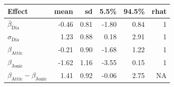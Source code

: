 
\begin{tabular}[t]{lrrrrr}
\toprule
Effect & mean & sd & 5.5\% & 94.5\% & rhat\\
\midrule
$\overline{\beta}_{\text{Dia}}$ & -0.46 & 0.81 & -1.80 & 0.84 & 1\\
$\sigma_{\text{Dia}}$ & 1.23 & 0.88 & 0.18 & 2.91 & 1\\
$\beta_{\text{Attic}}$ & -0.21 & 0.90 & -1.68 & 1.22 & 1\\
$\beta_{\text{Jonic}}$ & -1.62 & 1.16 & -3.55 & 0.15 & 1\\
$\beta_{\text{Attic}} - \beta_{\text{Jonic}}$ & 1.41 & 0.92 & -0.06 & 2.75 & NA\\
\bottomrule
\end{tabular}
